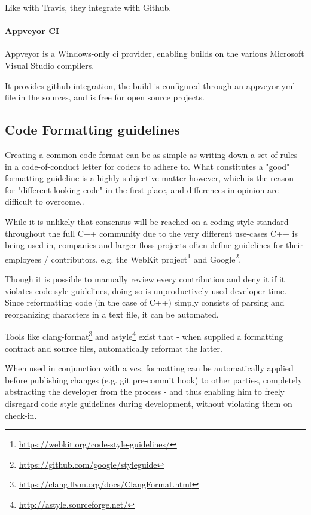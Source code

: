 Like with Travis, they integrate with Github.

\paragraph{Appveyor CI}
Appveyor is a Windows-only \gls{ci} provider, enabling builds on the various Microsoft Visual Studio compilers.

It provides github integration, the build is configured through an appveyor.yml file in the sources, and is free for open source projects.

\subsection{Code Formatting guidelines}
\label{sec:resformat}
Creating a common code format can be as simple as writing down a set of rules in a code-of-conduct letter for coders to adhere to. What constitutes a "good" formatting guideline is a highly subjective matter however, which is the reason for "different looking code" in the first place, and differences in opinion are difficult to overcome..

While it is unlikely that consensus will be reached on a coding style standard throughout the full C++ community due to the very different use-cases C++ is being used in, companies and larger \gls{floss} projects often define guidelines for their employees / contributors,
e.g. the WebKit project\footnote{\url{https://webkit.org/code-style-guidelines/}} and Google\footnote{\url{https://github.com/google/styleguide}}.

Though it is possible to manually review every contribution and deny it if it violates code syle guidelines, doing so is unproductively used developer time. Since reformatting code (in the case of C++) simply consists of parsing and reorganizing characters in a text file, it can be automated.

Tools like clang-format\footnote{\url{https://clang.llvm.org/docs/ClangFormat.html}} and astyle\footnote{\url{http://astyle.sourceforge.net/}} exist that - when supplied a formatting contract and source files, automatically reformat the latter.

When used in conjunction with a \gls{vcs}, formatting can be automatically applied before publishing changes (e.g. git pre-commit hook) to other parties, completely abstracting the developer from the process - and thus enabling him to freely disregard code style guidelines during development, without violating them on check-in.

